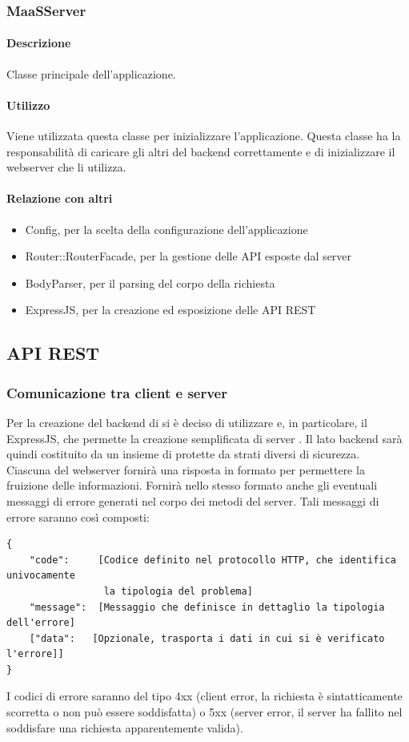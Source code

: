 \subsubsection{MaaSServer}
\paragraph*{Descrizione}
Classe principale dell'applicazione.

\paragraph*{Utilizzo}
Viene utilizzata questa classe per inizializzare l'applicazione. Questa classe ha la responsabilità di caricare gli altri  del backend correttamente e di inizializzare il webserver che li utilizza.
\paragraph*{Relazione con altri }
\begin{itemize}
\item Config, per la scelta della configurazione dell'applicazione
\item Router::RouterFacade, per la gestione delle API esposte dal server
\item BodyParser, per il parsing del corpo della richiesta
\item ExpressJS, per la creazione ed esposizione delle API REST
\end{itemize}

\subsection{API REST}
\subsubsection{Comunicazione tra client e server}
Per la creazione del backend di  si è deciso di utilizzare  e, in particolare, il  ExpressJS, che permette la creazione semplificata di server . Il lato backend sarà quindi costituito da un insieme di  protette da strati diversi di sicurezza. \\
Ciascuna  del webserver fornirà una risposta in formato  per permettere la fruizione delle informazioni. Fornirà nello stesso formato anche gli eventuali messaggi di errore generati nel corpo dei metodi del server. Tali messaggi di errore saranno così composti: 
\begin{verbatim}
{
    "code":     [Codice definito nel protocollo HTTP, che identifica univocamente
                 la tipologia del problema]
    "message":  [Messaggio che definisce in dettaglio la tipologia dell'errore]
    ["data":   [Opzionale, trasporta i dati in cui si è verificato l'errore]]
}
\end{verbatim}
I codici di errore saranno del tipo 4xx (client error, la richiesta è sintatticamente scorretta o non può essere soddisfatta) o 5xx (server error, il server ha fallito nel soddisfare una richiesta apparentemente valida).
